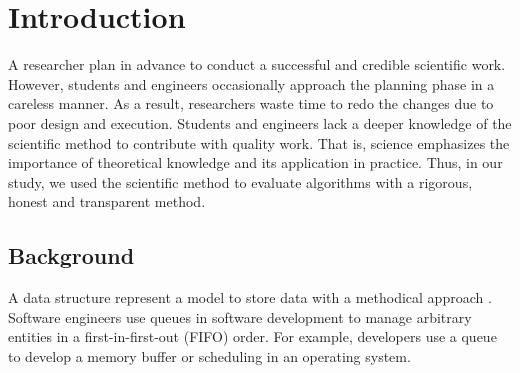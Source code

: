 \documentclass[a4paper,11pt]{kth-mag}
\begin{document}

\chapter{Introduction}
A researcher plan in advance to conduct a successful and credible scientific work.
However, students and engineers occasionally approach the planning phase in a careless manner.
As a result, researchers waste time to redo the changes due to poor design and execution.
Students and engineers lack a deeper knowledge of the scientific method to contribute with quality work.
That is, science emphasizes the importance of theoretical knowledge and its application in practice.
Thus, in our study, we used the scientific method to evaluate algorithms with a rigorous, honest and transparent method.

\section{Background}
A data structure represent a model to store data with a methodical approach \cite{deshpande2004c}.
Software engineers use queues in software development to manage arbitrary entities in a first-in-first-out (FIFO) order.
For example, developers use a queue to develop a memory buffer or scheduling in an operating system.
\end{document}
